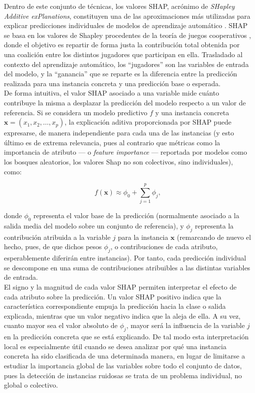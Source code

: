 \documentclass[print, color]{ugrTFG}
\begin{document}
    Dentro de este conjunto de técnicas, los valores SHAP, acrónimo de \textit{SHapley Additive exPlanations}, constituyen una de las aproximaciones más utilizadas para explicar predicciones individuales de modelos de aprendizaje automático \cite{lundberg2017unifiedapproachinterpretingmodel}. SHAP se basa en los valores de Shapley procedentes de la teoría de juegos cooperativos \cite{shapley1953value}, donde el objetivo es repartir de forma justa la contribución total obtenida por una coalición entre los distintos jugadores que participan en ella. Trasladado al contexto del aprendizaje automático, los ``jugadores'' son las variables de entrada del modelo, y la ``ganancia'' que se reparte es la diferencia entre la predicción realizada para una instancia concreta y una predicción base o esperada.\\
    
    De forma intuitiva, el valor SHAP asociado a una variable mide cuánto contribuye la misma a desplazar la predicción del modelo respecto a un valor de referencia. Si se considera un modelo predictivo $f$ y una instancia concreta $\mathbf{x} = (x_1, x_2, \ldots, x_p)$, la explicación aditiva proporcionada por SHAP puede expresarse, de manera independiente para cada una de las instancias (y esto último es de extrema relevancia, pues al contrario que métricas como la importancia de atributo --- o \textit{feature importance} --- reportada por modelos como los bosques aleatorios, los valores Shap no son colectivos, sino individuales), como:
    
    \[
    f(\mathbf{x}) \approx \phi_0 + \sum_{j=1}^{p} \phi_j,
    \]
    
    donde $\phi_0$ representa el valor base de la predicción (normalmente asociado a la salida media del modelo sobre un conjunto de referencia), y $\phi_j$ representa la contribución atribuida a la variable $j$ para la instancia $\mathbf{x}$ (remarcando de nuevo el hecho, pues, de que dichos pesos $\phi_j$, o contribuciones de cada atributo, esperablemente diferirán entre instancias). Por tanto, cada predicción individual se descompone en una suma de contribuciones atribuibles a las distintas variables de entrada.\\
    
    El signo y la magnitud de cada valor SHAP permiten interpretar el efecto de cada atributo sobre la predicción. Un valor SHAP positivo indica que la característica correspondiente empuja la predicción hacia la clase o salida explicada, mientras que un valor negativo indica que la aleja de ella. A su vez, cuanto mayor sea el valor absoluto de $\phi_j$, mayor será la influencia de la variable $j$ en la predicción concreta que se está explicando. De tal modo esta interpretación local es especialmente útil cuando se desea analizar por qué una instancia concreta ha sido clasificada de una determinada manera, en lugar de limitarse a estudiar la importancia global de las variables sobre todo el conjunto de datos, pues la detección de instancias ruidosas se trata de un problema individual, no global o colectivo.\\
    
\end{document}
